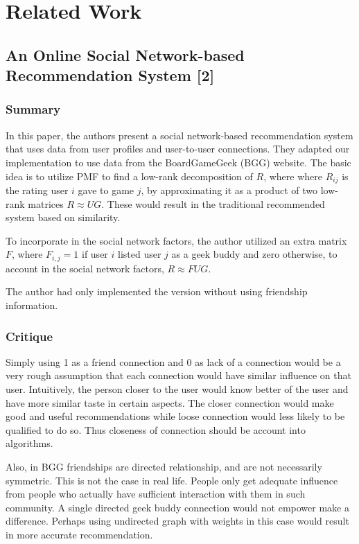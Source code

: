 \documentclass{article}
\begin{document}
\section{Related Work}
\subsection{An Online Social Network-based Recommendation System [2]}

\subsubsection{Summary}
In this paper, the authors present a social network-based recommendation system that uses data from user profiles and user-to-user connections. They adapted our implementation to use data from the BoardGameGeek (BGG) website. 
The basic idea is to utilize PMF to find a low-rank decomposition of $R$, where where $R_{ij}$ is the rating user $i$ gave to game $j$, by approximating it as a product of two low-rank matrices $R\approx UG$. These would result in the traditional recommended system based on similarity.

To incorporate in the social network factors, the author utilized an extra matrix $F$, where $F_{i,j} = 1$ if user $i$ listed user $j$ as a geek buddy and zero otherwise, to account in the social network factors, $R\approx FUG $.

The author had only implemented the version without using friendship information.

\subsubsection{Critique}
Simply using 1 as a friend connection and 0 as lack of a connection would be a very rough assumption that each connection would have similar influence on that user. Intuitively, the person closer to the user would know better of the user and have more similar taste in certain aspects. The closer connection would make good and useful recommendations while loose connection would less likely to be qualified to do so. Thus closeness of connection should be account into algorithms.

Also, in BGG friendships are directed relationship, and are not necessarily symmetric. This is not the case in real life. People only get adequate influence from people who actually have sufficient interaction with them in such community. A single directed geek buddy connection would not empower make a difference. Perhaps using undirected graph with weights in this case would result in more accurate recommendation.
\end{document}
